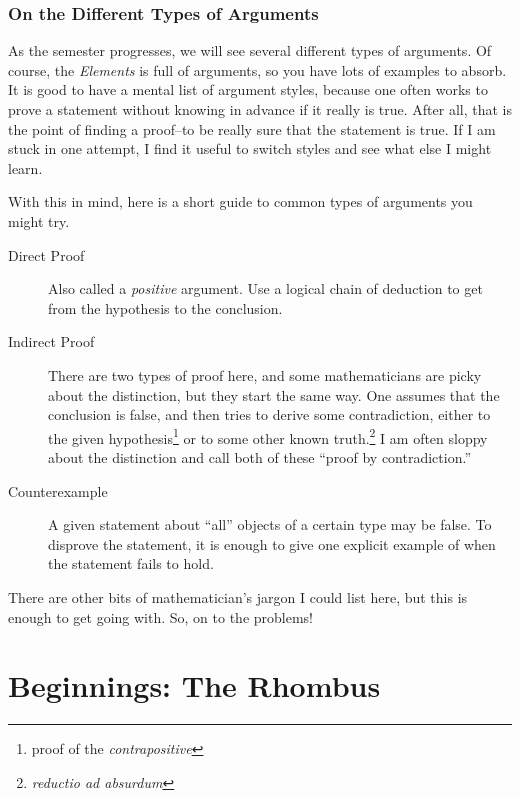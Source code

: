 \subsection*{On the Different Types of Arguments}
As the semester progresses, we will see several different types of arguments.
Of course, the \emph{Elements} is full of arguments, so you have lots of examples to absorb.
It is good to have a mental list of argument styles, because one often works to prove a statement without knowing in advance if it really is true.
After all, that is the point of finding a proof--to be really sure that the statement is true.
If I am stuck in one attempt, I find it useful to switch styles and see what else I might learn.

With this in mind, here is a short guide to common types of arguments you might try.

\begin{description}
\item[Direct Proof] Also called a \emph{positive} argument.
Use a logical chain of deduction to get from the hypothesis to the conclusion.

\item[Indirect Proof] There are two types of proof here, and some mathematicians are picky about the distinction, but they start the same way.
One assumes that the conclusion is false, and then tries to derive some contradiction, either to the given hypothesis\footnote{proof of the \emph{contrapositive}} or to some other known truth.\footnote{\emph{reductio ad absurdum}}
I am often sloppy about the distinction and call both of these ``proof by contradiction.''

\item[Counterexample] A given statement about ``all'' objects of a certain type may be false. To disprove the statement, it is enough to give one explicit example of when the statement fails to hold.
\end{description}

There are other bits of mathematician's jargon I could list here, but this is enough to get going with. So, on to the problems!






\mainmatter

\chapter{Beginnings: The Rhombus}\label{section:rhombi}

